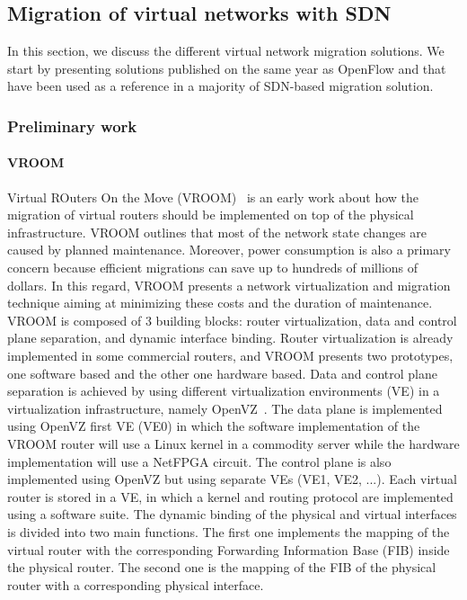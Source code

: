 \newpage
\subsection{Migration of virtual networks with SDN}
\label{sec:sota-vnmigration}
In this section, we discuss the different virtual network migration solutions.
We start by presenting solutions published on the same year as OpenFlow and that have been used as a reference in a majority of SDN-based migration solution.

\subsubsection{Preliminary work}

\paragraph{VROOM}
Virtual ROuters On the Move (VROOM)~\cite{VROOM-Wang2008} is an early work about how the migration of virtual routers should be implemented on top of the physical infrastructure. 
VROOM outlines that most of the network state changes are caused by planned maintenance.
Moreover, power consumption is also a primary concern because efficient migrations can save up to hundreds of millions of dollars.
In this regard, VROOM presents a network virtualization and migration technique aiming at minimizing these costs and the duration of maintenance.
VROOM is composed of 3 building blocks: router virtualization, data and control plane separation, and dynamic interface binding.
Router virtualization is already implemented in some commercial routers, and VROOM presents two prototypes, one software based and the other one hardware based.
Data and control plane separation is achieved by using different virtualization environments (VE) in a virtualization infrastructure, namely OpenVZ~\cite{openvz}.
The data plane is implemented using OpenVZ first VE (VE0) in which the software implementation of the VROOM router will use a Linux kernel in a commodity server while the hardware implementation will use a NetFPGA circuit.
The control plane is also implemented using OpenVZ but using separate VEs (VE1, VE2, ...).
Each virtual router is stored in a VE, in which a kernel and routing protocol are implemented using a software suite.
The dynamic binding of the physical and virtual interfaces is divided into two main functions.
The first one implements the mapping of the virtual router with the corresponding Forwarding Information Base (FIB) inside the physical router.
The second one is the mapping of the FIB of the physical router with a corresponding physical interface.


